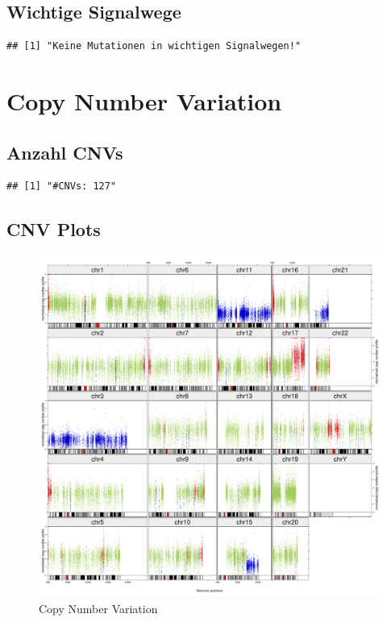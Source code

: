 \documentclass[woside,a4paper,12pt]{article}\usepackage[]{graphicx}\usepackage[]{color}
\makeatletter
\newenvironment{kframe}{%
 \def\at@end@of@kframe{}%
 \ifinner\ifhmode%
  \def\at@end@of@kframe{\end{minipage}}%
  \begin{minipage}{\columnwidth}%
 \fi\fi%
 \def\FrameCommand##1{\hskip\@totalleftmargin \hskip-\fboxsep
 \colorbox{shadecolor}{##1}\hskip-\fboxsep
     \hskip-\linewidth \hskip-\@totalleftmargin \hskip\columnwidth}%
 \MakeFramed {\advance\hsize-\width
   \@totalleftmargin\z@ \linewidth\hsize
   \@setminipage}}%
 {\par\unskip\endMakeFramed%
 \at@end@of@kframe}
\newenvironment{knitrout}{}{} %
\makeatother
\begin{document}
\begin{landscape}
\begin{knitrout}
\end{knitrout}
\clearpage
\subsection{Wichtige Signalwege}
\thispagestyle{empty}
\begin{knitrout}
\color{fgcolor}\begin{kframe}
\begin{verbatim}
## [1] "Keine Mutationen in wichtigen Signalwegen!"
\end{verbatim}
\end{kframe}
\end{knitrout}
\clearpage
\end{landscape}

\section{Copy Number Variation}
\subsection{Anzahl CNVs}
\begin{knitrout}
\color{fgcolor}\begin{kframe}
\begin{verbatim}
## [1] "#CNVs: 127"
\end{verbatim}
\end{kframe}
\end{knitrout}
\subsection{CNV Plots}
\begin{figure}[H]
\centering
\includegraphics[width=\textwidth]{somaticGermline_TCRBOA6_VCRome_CNV_Plot_2019-01-12.pdf}
\caption{Copy Number Variation}
\label{fig:11}
\end{figure}
\end{document}
